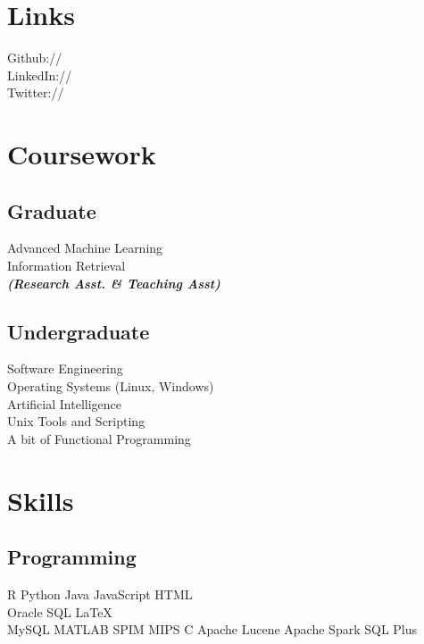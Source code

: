 \documentclass[]{deedy-resume-openfont}
\begin{document}
\begin{minipage}[t]{0.33\textwidth}
\sectionsep


\section{Links} 
Github:// \href{https://github.com/it21208}{} \\
LinkedIn://  \href{https://www.linkedin.com/in/alexandrosioannidis}{} \\
Twitter://  \href{https://twitter.com/it21208alex}{} \\
\sectionsep


\section{Coursework}
\subsection{Graduate}
Advanced Machine Learning \\
Information Retrieval  \\
{\footnotesize \textit{\textbf{(Research Asst. \& Teaching Asst) }}}
\sectionsep

\subsection{Undergraduate}
Software Engineering \\
Operating Systems (Linux, Windows) \\
Artificial Intelligence \\
Unix Tools and Scripting \\
A bit of Functional Programming \\
\sectionsep


\section{Skills}
\subsection{Programming}
R  \textbullet{}  Python \textbullet{} Java \textbullet{} 
JavaScript \textbullet{} HTML \\ \textbullet{} Oracle SQL \textbullet{} \LaTeX\ \\ 
MySQL \textbullet{} MATLAB \textbullet{} SPIM MIPS \textbullet{} C 
Apache Lucene \textbullet{} Apache Spark \textbullet{} SQL Plus
\sectionsep


\end{minipage}
\end{document}
